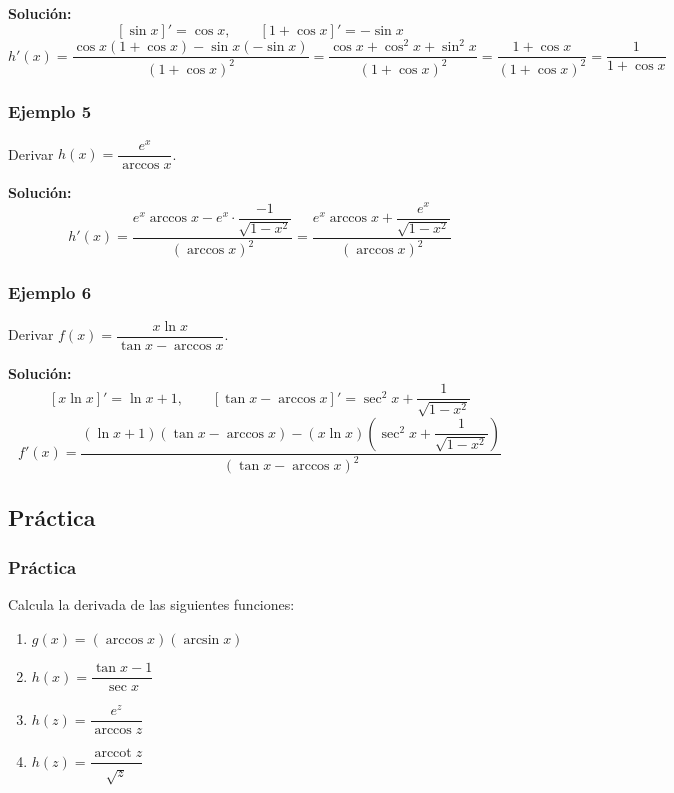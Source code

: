 \documentclass[12pt]{article}
\begin{document}
\textbf{Solución:}
\[
[\sin x]' = \cos x, \qquad [1 + \cos x]' = -\sin x
\]
\[
h'(x) = \frac{\cos x (1 + \cos x) - \sin x(-\sin x)}{(1 + \cos x)^2} = \frac{\cos x + \cos^2 x + \sin^2 x}{(1 + \cos x)^2} = \frac{1 + \cos x}{(1 + \cos x)^2} = \frac{1}{1 + \cos x}
\]



\subsubsection{Ejemplo 5}


Derivar $h(x) = \dfrac{e^x}{\arccos x}$.

\textbf{Solución:}
\[
h'(x) = \frac{e^x \arccos x - e^x \cdot \dfrac{-1}{\sqrt{1 - x^2}}}{(\arccos x)^2} = \frac{e^x \arccos x + \dfrac{e^x}{\sqrt{1 - x^2}}}{(\arccos x)^2}
\]



\subsubsection{Ejemplo 6}


Derivar $f(x) = \dfrac{x \ln x}{\tan x - \arccos x}$.

\textbf{Solución:}
\[
[x \ln x]' = \ln x + 1, \qquad [\tan x - \arccos x]' = \sec^2 x + \frac{1}{\sqrt{1 - x^2}}
\]
\[
f'(x) = \frac{(\ln x + 1)(\tan x - \arccos x) - (x \ln x)\left(\sec^2 x + \dfrac{1}{\sqrt{1 - x^2}}\right)}{(\tan x - \arccos x)^2}
\]



\subsection{Práctica}

\subsubsection{Práctica}


Calcula la derivada de las siguientes funciones:
\begin{enumerate}
    \item $g(x) = (\arccos x)(\arcsin x)$
    \item $h(x) = \dfrac{\tan x - 1}{\sec x}$
    \item $h(z) = \dfrac{e^z}{\arccos z}$
    \item $h(z) = \dfrac{\operatorname{arccot} z}{\sqrt{z}}$
\end{enumerate}
\end{document}
